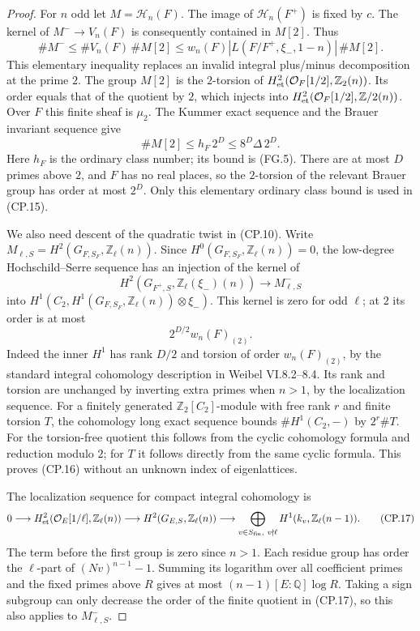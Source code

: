 \begin{proof}
For $n$ odd let $M=\mathcal H_n(F)$.  The image of
$\mathcal H_n(F^+)$ is fixed by $c$.  The kernel of
$M^-\to V_n(F)$ is consequently contained in $M[2]$.
Thus
\[
            \#M^-\leq\#V_n(F)\,\#M[2]
                  \leq w_n(F)|L(F/F^+,\xi_-,1-n)|\,\#M[2].       \tag{CP.14}
\]
This elementary inequality replaces an invalid integral
plus/minus decomposition at the prime $2$.
The group $M[2]$ is the $2$-torsion of
$H^2_{\rm et}(\mathcal O_F[1/2],\mathbb Z_2(n))$.
Its order equals that of the quotient by $2$, which injects
into $H^2_{\rm et}(\mathcal O_F[1/2],\mathbb Z/2(n))$.
Over $F$ this finite sheaf is $\mu_2$.  The Kummer exact
sequence and the Brauer invariant sequence give
\[
                  \#M[2]\leq h_F\,2^D
                          \leq 8^D\Delta\,2^D.                  \tag{CP.15}
\]
Here $h_F$ is the ordinary class number; its bound is (FG.5).
There are at most $D$ primes above $2$, and $F$ has no real
places, so the $2$-torsion of the relevant Brauer group has
order at most $2^D$.  Only this elementary ordinary class
bound is used in (CP.15).

We also need descent of the quadratic twist in (CP.10).
Write $M_{\ell,S}=H^2(G_{F,S_F},\mathbb Z_\ell(n))$.
Since $H^0(G_{F,S_F},\mathbb Z_\ell(n))=0$, the low-degree
Hochschild--Serre sequence has an injection of the kernel of
\[
 H^2(G_{F^+,S},\mathbb Z_\ell(\xi_-)(n))
                       \longrightarrow M_{\ell,S}^{-}
\]
into $H^1(C_2,H^1(G_{F,S_F},\mathbb Z_\ell(n))\otimes\xi_-)$.
This kernel is zero for odd $\ell$; at $2$ its order is at most
\[
                         2^{D/2}w_n(F)_{(2)}.                    \tag{CP.16}
\]
Indeed the inner $H^1$ has rank $D/2$ and torsion of order
$w_n(F)_{(2)}$, by the standard integral cohomology description
in Weibel VI.8.2--8.4.  Its rank and torsion are unchanged by
inverting extra primes when $n>1$, by the localization sequence.
For a finitely generated $\mathbb Z_2[C_2]$-module with free
rank $r$ and finite torsion $T$, the cohomology long exact
sequence bounds $\#H^1(C_2,-)$ by $2^r\#T$.
For the torsion-free quotient this follows from the cyclic
cohomology formula and reduction modulo $2$; for $T$ it
follows directly from the same cyclic formula.  This proves
(CP.16) without an unknown index of eigenlattices.

The localization sequence for compact integral cohomology is
\[
 0\longrightarrow H^2_{\rm et}(\mathcal O_E[1/\ell],\mathbb Z_\ell(n))
 \longrightarrow H^2(G_{E,S},\mathbb Z_\ell(n))
 \longrightarrow\bigoplus_{v\in S_{\rm fin},\ v\nmid\ell}
                  H^1(k_v,\mathbb Z_\ell(n-1)).                  \tag{CP.17}
\]
The term before the first group is zero since $n>1$.
Each residue group has order the $\ell$-part of
$(Nv)^{n-1}-1$.  Summing its logarithm over all coefficient
primes and the fixed primes above $R$ gives at most
$(n-1)[E:\mathbb Q]\log R$.
Taking a sign subgroup can only decrease the order of the
finite quotient in (CP.17), so this also applies to $M_{\ell,S}^-$.


\end{proof}
